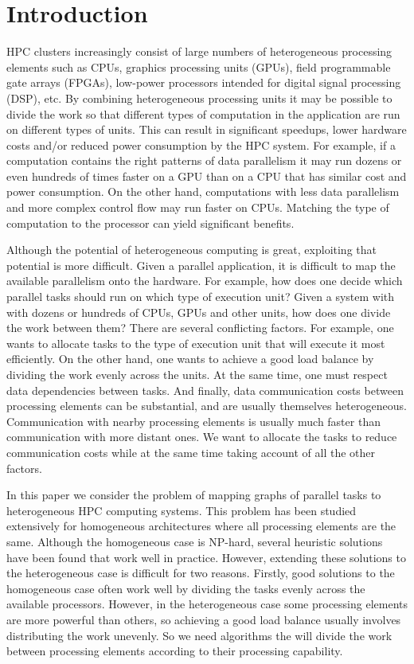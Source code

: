 \section{Introduction}
\label{sec:introduction}

HPC clusters increasingly consist of large numbers of heterogeneous
processing elements such as CPUs, graphics processing units (GPUs),
field programmable gate arrays (FPGAs), low-power processors intended
for digital signal processing (DSP), etc. By combining heterogeneous
processing units it may be possible to divide the work so that different
types of computation in the application are run on different types of
units. This can result in significant speedups, lower hardware costs
and/or reduced power consumption by the HPC system.  For example, if a
computation contains the right patterns of data parallelism it may run
dozens or even hundreds of times faster on a GPU than on a CPU that has
similar cost and power consumption. On the other hand, computations with
less data parallelism and more complex control flow may run faster on
CPUs. Matching the type of computation to the processor can yield
significant benefits.

Although the potential of heterogeneous computing is great, exploiting
that potential is more difficult. Given a parallel application, it is
difficult to map the available parallelism onto the hardware. For
example, how does one decide which parallel tasks should run on which
type of execution unit? Given a system with with dozens or hundreds of
CPUs, GPUs and other units, how does one divide the work between them?
There are several conflicting factors. For example, one wants to
allocate tasks to the type of execution unit that will execute it most
efficiently. On the other hand, one wants to achieve a good load balance
by dividing the work evenly across the units. At the same time, one must
respect data dependencies between tasks. And finally, data communication
costs between processing elements can be substantial, and are usually
themselves heterogeneous. Communication with nearby processing elements
is usually much faster than communication with more distant ones. We
want to allocate the tasks to reduce communication costs while at the
same time taking account of all the other factors.

In this paper we consider the problem of mapping graphs of parallel
tasks to heterogeneous HPC computing systems. This problem has been
studied extensively for homogeneous architectures where all processing
elements are the same. Although the homogeneous case is NP-hard, several
heuristic solutions have been found that work well in practice. However,
extending these solutions to the heterogeneous case is difficult for two
reasons. Firstly, good solutions to the homogeneous case often work well
by dividing the tasks evenly across the available processors. However,
in the heterogeneous case some processing elements are more powerful
than others, so achieving a good load balance usually involves
distributing the work unevenly. So we need algorithms the will divide
the work between processing elements according to their processing
capability.

